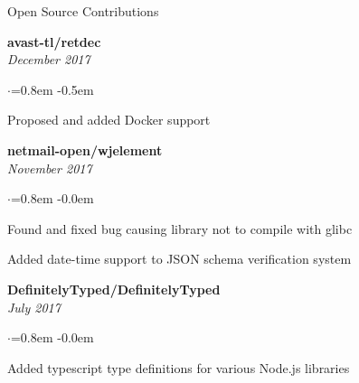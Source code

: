 \documentclass{resume}
\begin{document}
  \begin{rSection}{Open Source Contributions}
  	\vspace{-0.5em}
  	\begin{center}
  		\begin{minipage}[t]{0.33333\textwidth}
  			\raggedright
  			{\bf avast-tl/retdec} \\
  			{\em December 2017}\\
  			\begin{list}{$\cdot$}{\leftmargin=0.8em}
  				\itemsep -0.5em \vspace{-0.2em}
  				\item {\small Proposed and added Docker
support}
  			\end{list}
  		\end{minipage}%
	  	\begin{minipage}[t]{0.33333\textwidth}
	  		\raggedright
	  		{\bf netmail-open/wjelement}
\\
  			{\em November 2017} \\
  			\begin{list}{$\cdot$}{\leftmargin=0.8em}
  				\itemsep -0.0em \vspace{-0.2em}
  				\item {\small Found and fixed bug causing library
not to compile with glibc}
  				\item {\small Added date-time support to JSON
schema verification system}
  			\end{list}
	  	\end{minipage}%
	  	\begin{minipage}[t]{0.33333\textwidth}
	  		\raggedright
	  		{\bf DefinitelyTyped/DefinitelyTyped}
\\
  			{\em July 2017} \\
  			\begin{list}{$\cdot$}{\leftmargin=0.8em}
  				\itemsep -0.0em \vspace{-0.2em}
  				\item {\small Added typescript type definitions for various Node.js libraries}
  			\end{list}
	  	\end{minipage}
	  \end{center}
  \end{rSection}
\end{document}
